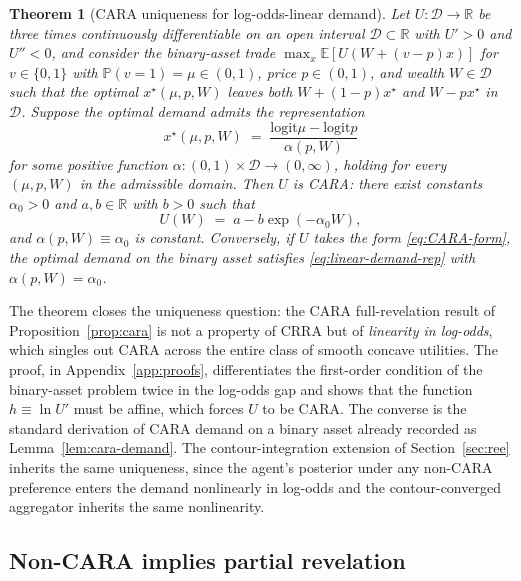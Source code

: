 \documentclass[12pt,letterpaper]{article}
\newtheorem{theorem}{Theorem}
\theoremstyle{definition}
\theoremstyle{remark}
\newcommand{\R}{\mathbb{R}}
\newcommand{\E}{\mathbb{E}}
\newcommand{\PP}{\mathbb{P}}
\newcommand{\logit}{\mathrm{logit}}
\newcommand{\1}{\mathbf{1}}
\begin{document}
\begin{theorem}[CARA uniqueness for log-odds-linear demand]\label{thm:cara-unique}
Let $U:\mathcal{D}\to\R$ be three times continuously differentiable on an
open interval $\mathcal{D}\subset\R$ with $U'>0$ and $U''<0$, and consider
the binary-asset trade $\max_{x}\E[U(W+(v-p)x)]$ for $v\in\{0,1\}$ with
$\PP(v=1)=\mu\in(0,1)$, price $p\in(0,1)$, and wealth $W\in\mathcal{D}$
such that the optimal $x^{\star}(\mu,p,W)$ leaves both $W+(1-p)x^{\star}$
and $W-px^{\star}$ in $\mathcal{D}$. Suppose the optimal demand admits the
representation
\begin{equation}
   x^{\star}(\mu,p,W) \;=\; \frac{\logit\mu-\logit p}{\alpha(p,W)}
\label{eq:linear-demand-rep}
\end{equation}
for some positive function $\alpha:(0,1)\times\mathcal{D}\to(0,\infty)$,
holding for every $(\mu,p,W)$ in the admissible domain. Then $U$ is CARA:
there exist constants $\alpha_{0}>0$ and $a,b\in\R$ with $b>0$ such that
\begin{equation}
   U(W) \;=\; a - b\exp(-\alpha_{0}W),
\label{eq:CARA-form}
\end{equation}
and $\alpha(p,W)\equiv\alpha_{0}$ is constant. Conversely, if $U$ takes
the form \eqref{eq:CARA-form}, the optimal demand on the binary asset
satisfies \eqref{eq:linear-demand-rep} with $\alpha(p,W)=\alpha_{0}$.
\end{theorem}

The theorem closes the uniqueness question: the CARA full-revelation
result of Proposition~\ref{prop:cara} is not a property of CRRA but of
\emph{linearity in log-odds}, which singles out CARA across the entire
class of smooth concave utilities. The proof, in
Appendix~\ref{app:proofs}, differentiates the first-order condition of
the binary-asset problem twice in the log-odds gap and shows that the
function $h\equiv\ln U'$ must be affine, which forces $U$ to be CARA.
The converse is the standard derivation of CARA demand on a binary asset
already recorded as Lemma~\ref{lem:cara-demand}. The contour-integration
extension of Section~\ref{sec:ree} inherits the same uniqueness, since
the agent's posterior under any non-CARA preference enters the demand
nonlinearly in log-odds and the contour-converged aggregator inherits
the same nonlinearity.

\subsection{Non-CARA implies partial revelation}
\end{document}
